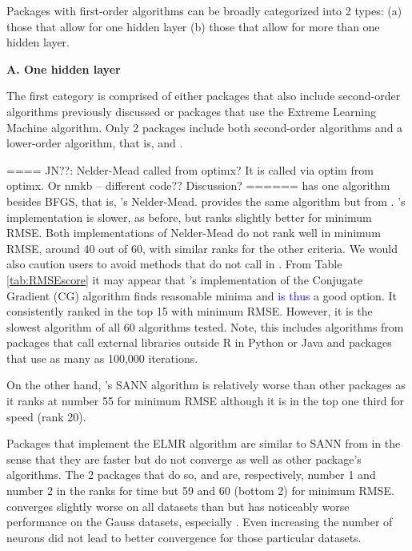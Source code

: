 Packages with first-order algorithms can be broadly categorized into 2
types: (a) those that allow for one hidden layer (b) those that allow
for more than one hidden layer.

\textbf{A. One hidden layer}

The first category is comprised of either packages that also include
second-order algorithms previously discussed or packages that use the
Extreme Learning Machine algorithm. Only 2 packages include both
second-order algorithms and a lower-order algorithm, that is,
 and .

==== JN??: Nelder-Mead called from optimx? It is called via optim from
optimx. Or nmkb -- different code?? Discussion? ======  has
one algorithm besides BFGS, that is, 's Nelder-Mead.
 provides the same algorithm but from .
's implementation is slower, as before, but ranks slightly
better for minimum RMSE. Both implementations of Nelder-Mead do not rank
well in minimum RMSE, around 40 out of 60, with similar ranks for the
other criteria. We would also caution users to avoid methods that do not
call  in . From Table \ref{tab:RMSEscore} it
may appear that 's implementation of the Conjugate
Gradient (CG) algorithm finds reasonable minima and
\textcolor{blue}{is thus} a good option. It consistently ranked in the
top 15 with minimum RMSE. However, it is the slowest algorithm of all 60
algorithms tested. Note, this includes algorithms from packages that
call external libraries outside \textsf{R} in \textsf{Python} or
\textsf{Java} and packages that use as many as 100,000 iterations.

On the other hand, 's SANN algorithm is relatively worse
than other packages as it ranks at number 55 for minimum RMSE although
it is in the top one third for speed (rank 20).

Packages that implement the ELMR algorithm are similar to SANN from
 in the sense that they are faster but do not converge as
well as other package's algorithms. The 2 packages that do so,
 \citep{R-elmNNRcpp} and 
\citep{R-ELMR} are, respectively, number 1 and number 2 in the ranks for
time but 59 and 60 (bottom 2) for minimum RMSE.  converges
slightly worse on all datasets than  but has noticeably
worse performance on the Gauss datasets, especially . Even
increasing the number of neurons did not lead to better convergence for
those particular datasets.

